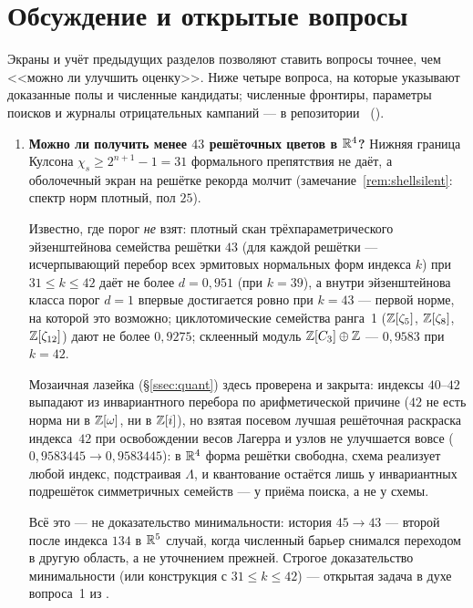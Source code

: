 \section{Обсуждение и открытые вопросы}\label{sec:open}

Экраны и учёт предыдущих разделов позволяют ставить вопросы точнее, чем
<<можно ли улучшить оценку>>. Ниже четыре вопроса, на которые указывают
доказанные полы и численные кандидаты; численные фронтиры, параметры поисков и
журналы отрицательных кампаний --- в репозитории~\cite{Repo}
().

\begin{enumerate}[leftmargin=1.5em,itemsep=4pt]
\item \textbf{Можно ли получить менее $43$ решёточных цветов в $\mathbb{R}^4$?}
Нижняя граница Кулсона $\chi_s\ge2^{n+1}-1=31$ \cite{Coulson,ABPR}
формального препятствия не даёт, а оболочечный экран на решётке рекорда
молчит (замечание~\ref{rem:shellsilent}: спектр норм плотный, пол $25$).

Известно, где порог \emph{не} взят: плотный скан трёхпараметрического
эйзенштейнова семейства решётки $43$ (для каждой решётки --- исчерпывающий
перебор всех эрмитовых нормальных форм индекса $k$) при $31\le k\le42$ даёт
не более $d=0{,}951$ (при $k=39$), а внутри эйзенштейнова класса порог $d=1$
впервые достигается ровно при $k=43$ --- первой норме, на которой это
возможно; циклотомические семейства ранга~1 ($\mathbb{Z}[\zeta_5]$, $\mathbb{Z}[\zeta_8]$,
$\mathbb{Z}[\zeta_{12}]$) дают не более $0{,}9275$; склеенный модуль
$\mathbb{Z}[C_3]\oplus\mathbb{Z}$ --- $0{,}9583$ при $k=42$.

Мозаичная лазейка
(\S\ref{ssec:quant}) здесь проверена и закрыта: индексы $40$--$42$ выпадают из
инвариантного перебора по арифметической причине ($42$ не есть норма ни в
$\mathbb{Z}[\omega]$, ни в $\mathbb{Z}[i]$), но взятая посевом лучшая решёточная раскраска
индекса~$42$ при освобождении весов Лагерра и узлов не улучшается вовсе
($0{,}9583445\to0{,}9583445$): в $\mathbb{R}^4$ форма решётки свободна, схема
реализует любой индекс, подстраивая $\Lambda$, и квантование остаётся лишь у
инвариантных подрешёток симметричных семейств --- у приёма поиска, а не у
схемы.

Всё это --- не доказательство минимальности: история $45\to43$ ---
второй после индекса $134$ в $\mathbb{R}^5$ случай, когда численный барьер снимался
переходом в другую область, а не уточнением прежней. Строгое доказательство
минимальности (или конструкция с $31\le k\le42$) --- открытая задача в духе
вопроса~1 из \cite{ABPR}.


\end{enumerate}
